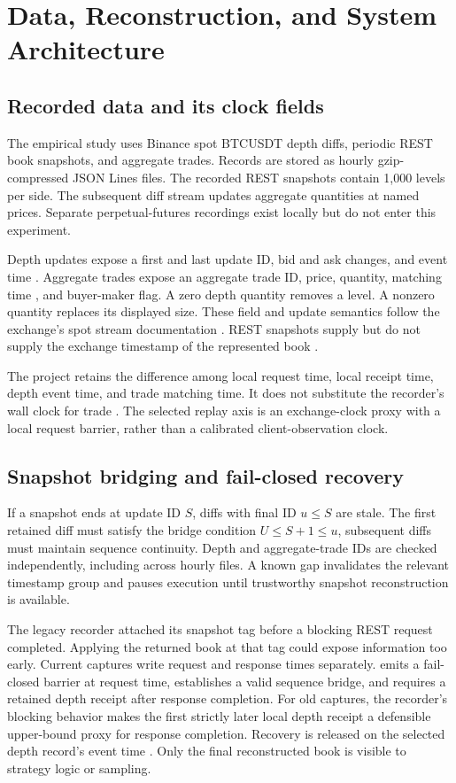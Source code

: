 \section{Data, Reconstruction, and System Architecture}

\subsection{Recorded data and its clock fields}

The empirical study uses Binance spot BTCUSDT depth diffs, periodic REST book
snapshots, and aggregate trades. Records are stored as hourly gzip-compressed
JSON Lines files. The recorded REST snapshots contain 1,000 levels per side.
The subsequent diff stream updates aggregate quantities at named prices.
Separate perpetual-futures recordings exist locally but do not enter this
experiment.

Depth updates expose a first and last update ID, bid and ask changes, and event
time . Aggregate trades expose an aggregate trade ID, price, quantity,
matching time , and buyer-maker flag. A zero depth quantity removes a
level. A nonzero quantity replaces its displayed size. These field and update
semantics follow the exchange's spot stream documentation
\citep{binancews2026}. REST snapshots supply  but do not
supply the exchange timestamp of the represented book
\citep{binancerest2026}.

The project retains the difference among local request time, local receipt
time, depth event time, and trade matching time. It does not substitute the
recorder's wall clock for trade . The selected replay axis is an
exchange-clock proxy with a local request barrier, rather than a calibrated
client-observation clock.

\subsection{Snapshot bridging and fail-closed recovery}

If a snapshot ends at update ID $S$, diffs with final ID $u\le S$ are stale.
The first retained diff must satisfy the bridge condition
$U\le S+1\le u$, subsequent diffs must maintain sequence continuity.
Depth and aggregate-trade IDs are checked independently, including across
hourly files. A known gap invalidates the relevant timestamp group and pauses
execution until trustworthy snapshot reconstruction is available.

The legacy recorder attached its snapshot tag before a blocking REST request
completed. Applying the returned book at that tag could expose information too
early. Current captures write request and response times separately.
 emits a fail-closed barrier at
request time, establishes a valid sequence bridge, and requires a retained
depth receipt after response completion. For old captures, the recorder's
blocking behavior makes the first strictly later local depth receipt a
defensible upper-bound proxy for response completion. Recovery is released on
the selected depth record's event time . Only the final reconstructed
book is visible to strategy logic or sampling.

